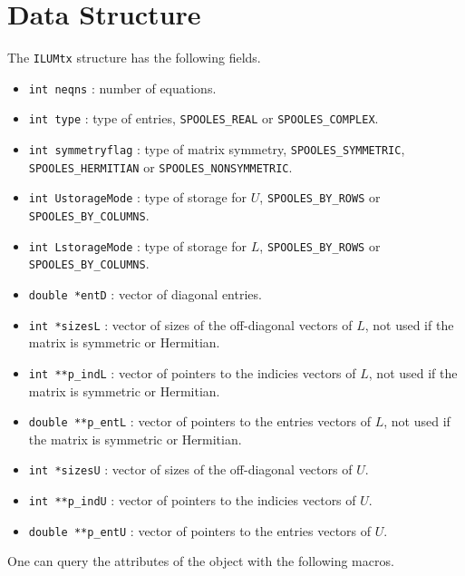 \par
\section{Data Structure}
\label{section:ILUMtx:dataStructure}
\par
\par
The {\tt ILUMtx} structure has the following fields.
\begin{itemize}
\item
{\tt int neqns} : number of equations.
\item
{\tt int type} : type of entries, {\tt SPOOLES\_REAL} or
{\tt SPOOLES\_COMPLEX}.
\item
{\tt int symmetryflag} : type of matrix symmetry, 
{\tt SPOOLES\_SYMMETRIC}, {\tt SPOOLES\_HERMITIAN} or
{\tt SPOOLES\_NONSYMMETRIC}.
\item
{\tt int UstorageMode} : type of storage for $U$,
{\tt SPOOLES\_BY\_ROWS} or {\tt SPOOLES\_BY\_COLUMNS}.
\item
{\tt int LstorageMode} : type of storage for $L$,
{\tt SPOOLES\_BY\_ROWS} or {\tt SPOOLES\_BY\_COLUMNS}.
\item
{\tt double *entD} : vector of diagonal entries.
\item
{\tt int *sizesL} : vector of sizes of the off-diagonal vectors of $L$,
not used if the matrix is symmetric or Hermitian.
\item
{\tt int **p\_indL} : vector of pointers to the indicies vectors of $L$,
not used if the matrix is symmetric or Hermitian.
\item
{\tt double **p\_entL} : vector of pointers to the entries vectors 
of $L$, not used if the matrix is symmetric or Hermitian.
\item
{\tt int *sizesU} : vector of sizes of the off-diagonal vectors of $U$.
\item
{\tt int **p\_indU} : vector of pointers to the indicies vectors of $U$.
\item
{\tt double **p\_entU} : vector of pointers to the entries vectors 
of $U$.
\end{itemize}
\par
One can query the attributes of the object with the following
macros.
